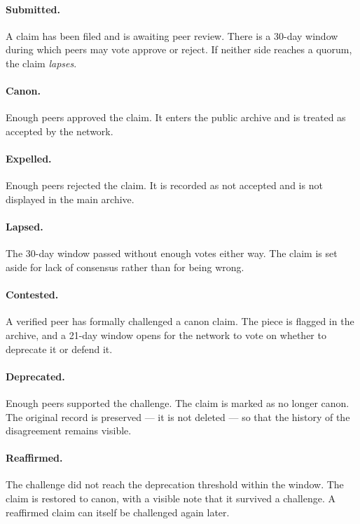 \documentclass[11pt,a4paper]{article}
\begin{document}
\paragraph{Submitted.} A claim has been filed and is awaiting peer
review. There is a 30-day window during which peers may vote
approve or reject. If neither side reaches a quorum, the claim
\emph{lapses}.

\paragraph{Canon.} Enough peers approved the claim. It enters the
public archive and is treated as accepted by the network.

\paragraph{Expelled.} Enough peers rejected the claim. It is recorded
as not accepted and is not displayed in the main archive.

\paragraph{Lapsed.} The 30-day window passed without enough votes
either way. The claim is set aside for lack of consensus rather than
for being wrong.

\paragraph{Contested.} A verified peer has formally challenged a
canon claim. The piece is flagged in the archive, and a 21-day
window opens for the network to vote on whether to deprecate it or
defend it.

\paragraph{Deprecated.} Enough peers supported the challenge. The
claim is marked as no longer canon. The original record is preserved
--- it is not deleted --- so that the history of the disagreement
remains visible.

\paragraph{Reaffirmed.} The challenge did not reach the deprecation
threshold within the window. The claim is restored to canon, with a
visible note that it survived a challenge. A reaffirmed claim can
itself be challenged again later.
\end{document}
